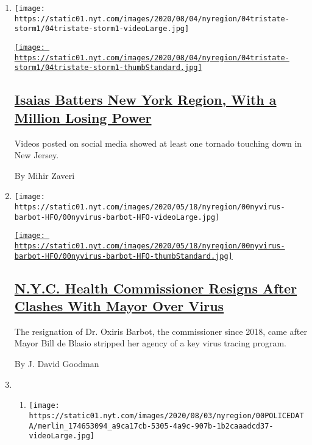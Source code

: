 \begin{enumerate}
\def\labelenumi{\arabic{enumi}.}
\item
  \texttt{[image: https://static01.nyt.com/images/2020/08/04/nyregion/04tristate-storm1/04tristate-storm1-videoLarge.jpg]}

  \href{/2020/08/04/nyregion/nj-ny-Isaias-hurricane-storm.html}{\texttt{[image: https://static01.nyt.com/images/2020/08/04/nyregion/04tristate-storm1/04tristate-storm1-thumbStandard.jpg]}}

  \hypertarget{isaias-batters-new-york-region-with-a-million-losing-power}{%
  \subsection{\texorpdfstring{\href{/2020/08/04/nyregion/nj-ny-Isaias-hurricane-storm.html}{Isaias
  Batters New York Region, With a Million Losing
  Power}}{Isaias Batters New York Region, With a Million Losing Power}}\label{isaias-batters-new-york-region-with-a-million-losing-power}}

  Videos posted on social media showed at least one tornado touching
  down in New Jersey.

  By Mihir Zaveri
\item
  \texttt{[image: https://static01.nyt.com/images/2020/05/18/nyregion/00nyvirus-barbot-HFO/00nyvirus-barbot-HFO-videoLarge.jpg]}

  \href{/2020/08/04/nyregion/oxiris-barbot-health-commissioner-resigns.html}{\texttt{[image: https://static01.nyt.com/images/2020/05/18/nyregion/00nyvirus-barbot-HFO/00nyvirus-barbot-HFO-thumbStandard.jpg]}}

  \hypertarget{nyc-health-commissioner-resigns-after-clashes-with-mayor-over-virus}{%
  \subsection{\texorpdfstring{\href{/2020/08/04/nyregion/oxiris-barbot-health-commissioner-resigns.html}{N.Y.C.
  Health Commissioner Resigns After Clashes With Mayor Over
  Virus}}{N.Y.C. Health Commissioner Resigns After Clashes With Mayor Over Virus}}\label{nyc-health-commissioner-resigns-after-clashes-with-mayor-over-virus}}

  The resignation of Dr. Oxiris Barbot, the commissioner since 2018,
  came after Mayor Bill de Blasio stripped her agency of a key virus
  tracing program.

  By J. David Goodman
\item
  \begin{enumerate}
  \def\labelenumii{\arabic{enumii}.}
  \item
    \texttt{[image: https://static01.nyt.com/images/2020/08/03/nyregion/00POLICEDATA/merlin\_174653094\_a9ca17cb-5305-4a9c-907b-1b2caaadcd37-videoLarge.jpg]}


\end{enumerate}
\end{enumerate}
